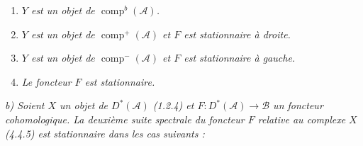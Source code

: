 \begin{enumerate}
\item[1)] \textit{$Y$ est un objet de $\operatorname{comp}^{b}(\mathcal A)$.}
\item[2)] \textit{$Y$ est un objet de $\operatorname{comp}^{+}(\mathcal A)$
et $F$ est stationnaire à droite.}
\item[3)] \textit{$Y$ est un objet de $\operatorname{comp}^{-}(\mathcal A)$
et $F$ est stationnaire à gauche.}
\item[4)] \textit{Le foncteur $F$ est stationnaire.}
\end{enumerate}

\noindent\textit{b) Soient $X$ un objet de $D^*(\mathcal A)$ (1.2.4) et
$F\colon D^*(\mathcal A)\longrightarrow\mathcal B$ un foncteur
cohomologique. La deuxième suite spectrale du foncteur $F$ relative au
complexe $X$ (4.4.5) est stationnaire dans les cas suivants :}
\endgroup
